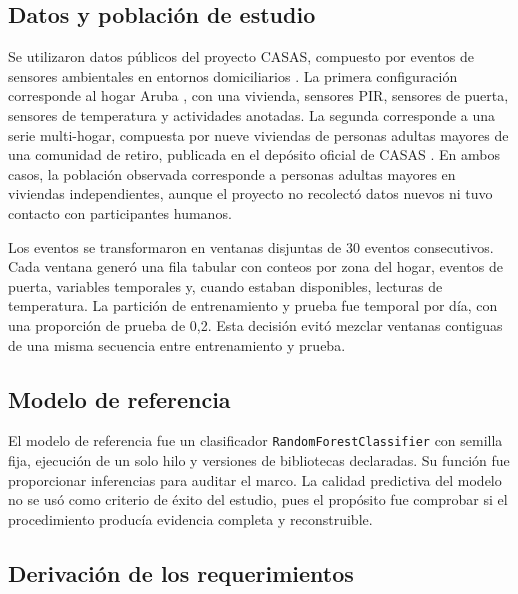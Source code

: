 \subsection{Datos y población de estudio}

Se utilizaron datos públicos del proyecto CASAS, compuesto por eventos de
sensores ambientales en entornos domiciliarios \cite{cook2013casas}. La primera
configuración corresponde al hogar Aruba \cite{cook2012aruba}, con una vivienda,
sensores PIR, sensores de puerta, sensores de temperatura y actividades
anotadas. La segunda corresponde a una serie multi-hogar, compuesta por nueve
viviendas de personas adultas mayores de una comunidad de retiro, publicada en
el depósito oficial de CASAS \cite{cook2025zenodo}.
En ambos casos, la población observada corresponde a personas adultas mayores
en viviendas independientes, aunque el proyecto no recolectó datos nuevos ni
tuvo contacto con participantes humanos.

Los eventos se transformaron en ventanas disjuntas de 30 eventos consecutivos.
Cada ventana generó una fila tabular con conteos por zona del hogar, eventos de
puerta, variables temporales y, cuando estaban disponibles, lecturas de
temperatura. La partición de entrenamiento y prueba fue temporal por día, con
una proporción de prueba de 0,2. Esta decisión evitó mezclar ventanas contiguas
de una misma secuencia entre entrenamiento y prueba.

\subsection{Modelo de referencia}

El modelo de referencia fue un clasificador \texttt{RandomForestClassifier}
\cite{breiman2001rf,pedregosa2011sklearn} con semilla fija, ejecución de un solo hilo y versiones de bibliotecas declaradas.
Su función fue proporcionar inferencias para auditar el marco. La calidad
predictiva del modelo no se usó como criterio de éxito del estudio, pues el
propósito fue comprobar si el procedimiento producía evidencia completa y
reconstruible.

\subsection{Derivación de los requerimientos}

